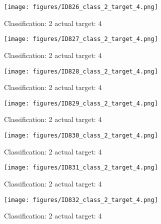 \begin{figure}[h!]
\begin{center}
\texttt{[image: figures/ID826\_class\_2\_target\_4.png]}
\end{center}
\caption{ Classification: 2 actual target: 4}
\label{fig:ID826_class_2_target_4}
\end{figure}
\begin{figure}[h!]
\begin{center}
\texttt{[image: figures/ID827\_class\_2\_target\_4.png]}
\end{center}
\caption{ Classification: 2 actual target: 4}
\label{fig:ID827_class_2_target_4}
\end{figure}
\begin{figure}[h!]
\begin{center}
\texttt{[image: figures/ID828\_class\_2\_target\_4.png]}
\end{center}
\caption{ Classification: 2 actual target: 4}
\label{fig:ID828_class_2_target_4}
\end{figure}
\begin{figure}[h!]
\begin{center}
\texttt{[image: figures/ID829\_class\_2\_target\_4.png]}
\end{center}
\caption{ Classification: 2 actual target: 4}
\label{fig:ID829_class_2_target_4}
\end{figure}
\begin{figure}[h!]
\begin{center}
\texttt{[image: figures/ID830\_class\_2\_target\_4.png]}
\end{center}
\caption{ Classification: 2 actual target: 4}
\label{fig:ID830_class_2_target_4}
\end{figure}
\begin{figure}[h!]
\begin{center}
\texttt{[image: figures/ID831\_class\_2\_target\_4.png]}
\end{center}
\caption{ Classification: 2 actual target: 4}
\label{fig:ID831_class_2_target_4}
\end{figure}
\begin{figure}[h!]
\begin{center}
\texttt{[image: figures/ID832\_class\_2\_target\_4.png]}
\end{center}
\caption{ Classification: 2 actual target: 4}
\label{fig:ID832_class_2_target_4}
\end{figure}
